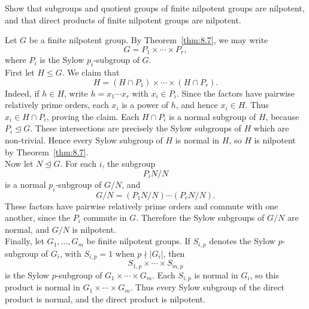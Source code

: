 \documentclass[../Odyssey_Project.tex]{subfiles}
\begin{document}
\begin{exercise}
\label{ex:8.5}
Show that subgroups and quotient groups of finite nilpotent groups are nilpotent, and that direct products of finite nilpotent groups are nilpotent.
\end{exercise}
\begin{solution}
Let $G$ be a finite nilpotent group. By Theorem~\ref{thm:8.7}, we may write
\[
    G=P_1\times\cdots\times P_r,
\]
where $P_i$ is the Sylow $p_i$-subgroup of $G$.\\
First let $H\leq G$. We claim that
\[
    H=(H\cap P_1)\times\cdots\times(H\cap P_r).
\]
Indeed, if $h\in H$, write $h=x_1\cdots x_r$ with $x_i\in P_i$. Since the factors have pairwise relatively prime orders, each $x_i$ is a power of $h$, and hence $x_i\in H$. Thus $x_i\in H\cap P_i$, proving the claim. Each $H\cap P_i$ is a normal subgroup of $H$, because $P_i\trianglelefteq G$. These intersections are precisely the Sylow subgroups of $H$ which are non-trivial. Hence every Sylow subgroup of $H$ is normal in $H$, so $H$ is nilpotent by Theorem~\ref{thm:8.7}.\\
Now let $N\trianglelefteq G$. For each $i$, the subgroup
\[
    P_iN/N
\]
is a normal $p_i$-subgroup of $G/N$, and
\[
    G/N=(P_1N/N)\cdots(P_rN/N).
\]
These factors have pairwise relatively prime orders and commute with one another, since the $P_i$ commute in $G$. Therefore the Sylow subgroups of $G/N$ are normal, and $G/N$ is nilpotent.\\
Finally, let $G_1,\ldots,G_m$ be finite nilpotent groups. If $S_{i,p}$ denotes the Sylow $p$-subgroup of $G_i$, with $S_{i,p}=1$ when $p\nmid \lvert G_i\rvert$, then
\[
    S_{1,p}\times\cdots\times S_{m,p}
\]
is the Sylow $p$-subgroup of $G_1\times\cdots\times G_m$. Each $S_{i,p}$ is normal in $G_i$, so this product is normal in $G_1\times\cdots\times G_m$. Thus every Sylow subgroup of the direct product is normal, and the direct product is nilpotent.
\end{solution}
\end{document}
